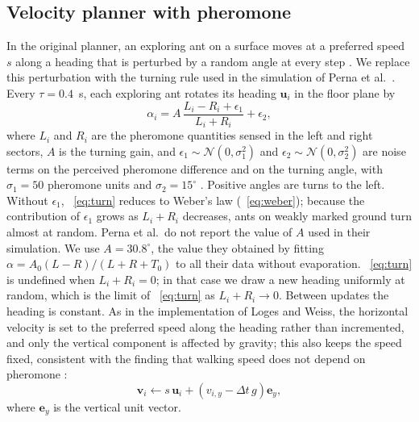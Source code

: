 \documentclass[9pt,twoside]{pnas-new}
\begin{document}
\subsection{Velocity planner with pheromone}
In the original planner, an exploring ant on a surface moves at a preferred speed $s$ along a heading that is perturbed by a random angle at every step \cite{loges2025}. We replace this perturbation with the turning rule used in the simulation of Perna et al.\ \cite{perna2012}. Every $\tau = 0.4$~s, each exploring ant rotates its heading $\mathbf{u}_i$ in the floor plane by
\begin{equation}
\alpha_i = A\,\frac{L_i - R_i + \epsilon_1}{L_i + R_i} + \epsilon_2,
\label{eq:turn}
\end{equation}
where $L_i$ and $R_i$ are the pheromone quantities sensed in the left and right sectors, $A$ is the turning gain, and $\epsilon_1 \sim \mathcal{N}(0,\sigma_1^2)$ and $\epsilon_2 \sim \mathcal{N}(0,\sigma_2^2)$ are noise terms on the perceived pheromone difference and on the turning angle, with $\sigma_1 = 50$ pheromone units and $\sigma_2 = 15^\circ$ \cite{perna2012}. Positive angles are turns to the left. Without $\epsilon_1$, ~\eqref{eq:turn} reduces to Weber's law (~\eqref{eq:weber}); because the contribution of $\epsilon_1$ grows as $L_i + R_i$ decreases, ants on weakly marked ground turn almost at random. Perna et al.\ do not report the value of $A$ used in their simulation. We use $A = 30.8^\circ$, the value they obtained by fitting $\alpha = A_0 (L-R)/(L+R+T_0)$ to all their data without evaporation. ~\eqref{eq:turn} is undefined when $L_i + R_i = 0$; in that case we draw a new heading uniformly at random, which is the limit of ~\eqref{eq:turn} as $L_i + R_i \to 0$. Between updates the heading is constant. As in the implementation of Loges and Weiss, the horizontal velocity is set to the preferred speed along the heading rather than incremented, and only the vertical component is affected by gravity; this also keeps the speed fixed, consistent with the finding that walking speed does not depend on pheromone \cite{perna2012}:
\begin{equation}
\mathbf{v}_i \gets s\,\mathbf{u}_i + \left(v_{i,y} - \Delta t\, g\right)\mathbf{e}_y,
\label{eq:velocity}
\end{equation}
where $\mathbf{e}_y$ is the vertical unit vector.
\end{document}

